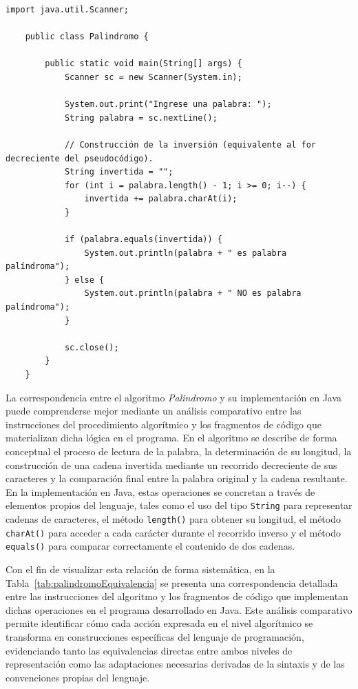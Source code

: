 \documentclass[12pt,twoside]{book}
\begin{document}
					\begin{lstlisting}[style=Java,caption={Resolución de una ecuación cuadrática},label={lst:palindromo}]
	import java.util.Scanner;
	
	public class Palindromo {
		
		public static void main(String[] args) {
			Scanner sc = new Scanner(System.in);
			
			System.out.print("Ingrese una palabra: ");
			String palabra = sc.nextLine();
			
			// Construcción de la inversión (equivalente al for decreciente del pseudocódigo).
			String invertida = "";
			for (int i = palabra.length() - 1; i >= 0; i--) {
				invertida += palabra.charAt(i);
			}
			
			if (palabra.equals(invertida)) {
				System.out.println(palabra + " es palabra palíndroma");
			} else {
				System.out.println(palabra + " NO es palabra palíndroma");
			}
			
			sc.close();
		}
	} \end{lstlisting}
				
					\noindent
					\noindent
					La correspondencia entre el algoritmo \textit{Palindromo} y su implementación en Java puede comprenderse mejor mediante un análisis comparativo entre las instrucciones del procedimiento algorítmico y los fragmentos de código que materializan dicha lógica en el programa. En el algoritmo se describe de forma conceptual el proceso de lectura de la palabra, la determinación de su longitud, la construcción de una cadena invertida mediante un recorrido decreciente de sus caracteres y la comparación final entre la palabra original y la cadena resultante. En la implementación en Java, estas operaciones se concretan a través de elementos propios del lenguaje, tales como el uso del tipo \texttt{String} para representar cadenas de caracteres, el método \texttt{length()} para obtener su longitud, el método \texttt{charAt()} para acceder a cada carácter durante el recorrido inverso y el método \texttt{equals()} para comparar correctamente el contenido de dos cadenas.
					
					Con el fin de visualizar esta relación de forma sistemática, en la Tabla~\ref{tab:palindromoEquivalencia} se presenta una correspondencia detallada entre las instrucciones del algoritmo y los fragmentos de código que implementan dichas operaciones en el programa desarrollado en Java. Este análisis comparativo permite identificar cómo cada acción expresada en el nivel algorítmico se transforma en construcciones específicas del lenguaje de programación, evidenciando tanto las equivalencias directas entre ambos niveles de representación como las adaptaciones necesarias derivadas de la sintaxis y de las convenciones propias del lenguaje.
					
\end{document}
